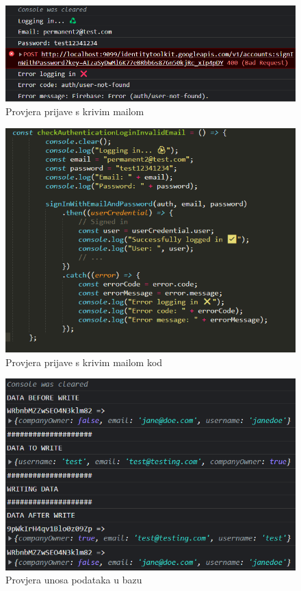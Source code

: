             \begin{figure}[H]
			\includegraphics[scale=0.6]{slike/provjera logina s krivim mailom.png}
			\centering
			\caption{Provjera prijave s krivim mailom }
			\label{fig:promjene}
		          \end{figure}

            \begin{figure}[H]
			\includegraphics[scale=0.8]{slike/krivi mail kod.png}
			\centering
			\caption{Provjera prijave s krivim mailom kod }
			\label{fig:promjene}
		          \end{figure}

            \begin{figure}[H]
			\includegraphics[scale=0.8]{slike/provjera pisanja u bazu.png}
			\centering
			\caption{Provjera unosa podataka u bazu }
			\label{fig:promjene}
		          \end{figure}

